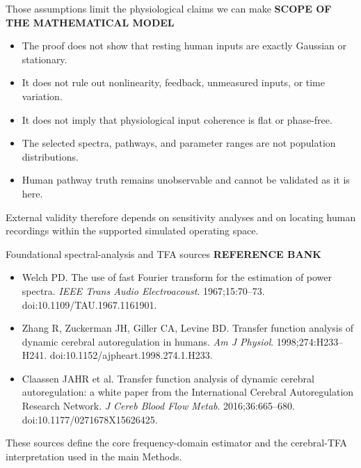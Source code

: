 \documentclass[aspectratio=169,11pt]{beamer}
\newcommand{\sectionlabel}[1]{%
  {\color{Accent}\fontsize{8}{9.5}\selectfont\bfseries\MakeUppercase{#1}}\par\vspace{0.12cm}}
\begin{document}
\begin{frame}{Those assumptions limit the physiological claims we can make}
\sectionlabel{Scope of the Mathematical Model}
\fontsize{10.5}{13.0}\selectfont
\begin{itemize}
  \item The proof does not show that resting human inputs are exactly Gaussian or stationary.
  \item It does not rule out nonlinearity, feedback, unmeasured inputs, or time variation.
  \item It does not imply that physiological input coherence is flat or phase-free.
  \item The selected spectra, pathways, and parameter ranges are not population distributions.
  \item Human pathway truth remains unobservable and cannot be validated as it is here.
\end{itemize}

\vspace{0.16cm}
External validity therefore depends on sensitivity analyses and on locating
human recordings within the supported simulated operating space.
\end{frame}

\begin{frame}{Foundational spectral-analysis and TFA sources}
\sectionlabel{Reference Bank}
\fontsize{9.4}{11.8}\selectfont
\begin{itemize}
  \item Welch PD. The use of fast Fourier transform for the estimation of power spectra. \emph{IEEE Trans Audio Electroacoust}. 1967;15:70--73. doi:10.1109/TAU.1967.1161901.
  \item Zhang R, Zuckerman JH, Giller CA, Levine BD. Transfer function analysis of dynamic cerebral autoregulation in humans. \emph{Am J Physiol}. 1998;274:H233--H241. doi:10.1152/ajpheart.1998.274.1.H233.
  \item Claassen JAHR et al. Transfer function analysis of dynamic cerebral autoregulation: a white paper from the International Cerebral Autoregulation Research Network. \emph{J Cereb Blood Flow Metab}. 2016;36:665--680. doi:10.1177/0271678X15626425.
\end{itemize}

\vspace{0.18cm}
These sources define the core frequency-domain estimator and the cerebral-TFA
interpretation used in the main Methods.
\end{frame}
\end{document}

